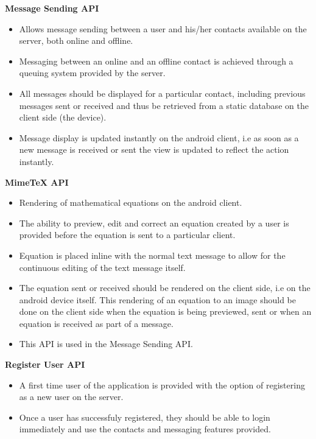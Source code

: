 \documentclass[29pt,a4paper]{moderncv}
\begin{document}
		\noindent \textbf{Message Sending API}
			\begin{itemize}
				\item Allows message sending between a user and his/her contacts available on the server, both online and offline.  
				\item Messaging between an online and an offline contact is achieved through a queuing system provided by the server.
				\item All messages should be displayed for a particular contact, including previous messages sent or received and thus be retrieved from a static database on the client side (the device).
				\item Message display is updated instantly on the android client, i.e as soon as a new message is received or sent the view is updated to reflect the action instantly.
				\\
			\end{itemize}
			
		\noindent \textbf{MimeTeX API}
			\begin{itemize}
				\item Rendering of mathematical equations on the android client.
				\item The ability to preview, edit and correct an equation created by a user is provided before the equation is sent to a particular client.
				\item Equation is placed inline with the normal text message to allow for the continuous editing of the text message itself.
				\item The equation sent or received should be rendered on the client side, i.e on the android device itself. This rendering of an equation to an image should be done on the client side when the equation is being previewed, sent or when an equation is received as part of a message.
				\item This API is used in the Message Sending API.
				\\
			\end{itemize}
			
		\noindent\textbf{Register User API}
			\begin{itemize}
				\item A first time user of the application is provided with the option of registering as a new user on the server.
				\item Once a user has successfuly registered, they should be able to login immediately and use the contacts and messaging features provided.
				\\
			\end{itemize}
			
\end{document}
